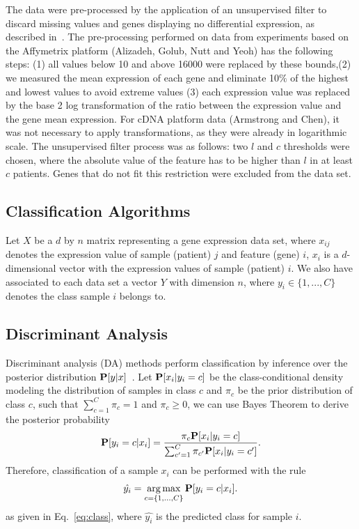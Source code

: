 \documentclass[runningheads,a4paper]{llncs}
\newcommand{\Prob}{\mbox{\bf P}}
\DeclareMathOperator*{\argmax}{arg\,max}
\begin{document}
The data were pre-processed by the application of an unsupervised
filter to discard missing values and genes displaying no differential
expression, as described in~\cite{Souto2008}. The pre-processing
performed on data from experiments based on the Affymetrix platform
(Alizadeh, Golub, Nutt and Yeoh) has the following steps: (1) all
values below 10 and above 16000 were replaced by these bounds,(2) we
measured the mean expression of each gene and eliminate 10$\%$ of the
highest and lowest values to avoid extreme values (3) each expression
value was replaced by the base 2 log transformation of the ratio
between the expression value and the gene mean expression. For cDNA
platform data (Armstrong and Chen), it was not necessary to apply
transformations, as they were already in logarithmic scale. The
unsupervised filter process was as follows: two $l$ and $c$ thresholds
were chosen, where the absolute value of the feature has to be higher
than $l$ in at least $c$ patients. Genes that do not fit this
restriction were excluded from the data set. 


\subsection{Classification Algorithms}

Let $X$ be a $d$ by $n$ matrix representing a gene expression data
set, where $x_{ij}$ denotes the expression value of sample (patient)
$j$ and feature (gene) $i$, $x_i$ is a $d$-dimensional vector with the
expression values of sample (patient) $i$. We also have associated to
each data set a vector $Y$ with dimension $n$, where $y_i \in \{1,...,C\}$
denotes the class sample $i$ belongs to.

\subsection{Discriminant Analysis}

Discriminant analysis (DA) methods perform classification by inference
over the posterior distribution $\Prob[y|x]$~\cite{Hastie2001}. Let
$\Prob[x_i|y_i=c]$ be the class-conditional density modeling the
distribution of samples in class $c$ and $\pi_c$ be the prior
distribution of class $c$, such that $\sum_{c=1}^C \pi_c =1$ and
$\pi_c \geq 0$, we can use Bayes Theorem to derive the posterior
probability
\begin{equation}
\label{eq:classcond}
\Prob[y_i=c|x_i] = \frac{\pi_c \Prob[x_i|y_i=c]}{\sum_{c'=1}^C \pi_{c'} \Prob[x_i|y_i=c']}.
\end{equation}
Therefore, classification of a sample $x_i$ can be performed with the
rule
\begin{equation}
\hat{y_i} = \argmax_{c=\{1,...,C\}} \Prob[y_i=c|x_i].
\label{eq:class}
\end{equation}
as given in Eq.~\ref{eq:class}, where $\hat{y_i}$ is the predicted class for sample $i$.
\end{document}
